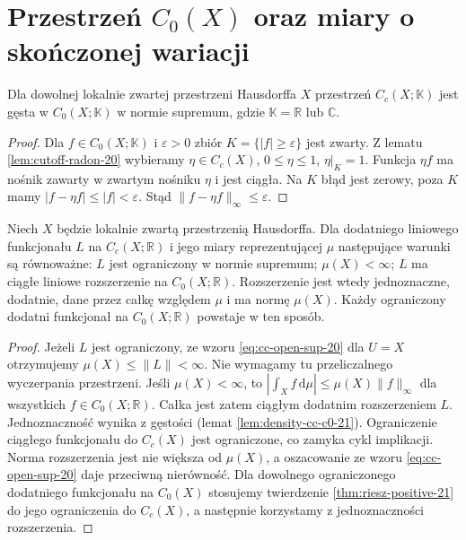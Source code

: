 \section{Przestrzeń \texorpdfstring{$C_0(X)$}{C\string_0(X)} oraz miary o skończonej wariacji}
\begin{lemat}[Gęstość $C_c(X)$ w $C_0(X)$]
\label{lem:density-cc-c0-21}
Dla dowolnej lokalnie zwartej przestrzeni Hausdorffa $X$
przestrzeń $C_c(X;\mathbb K)$ jest gęsta w
$C_0(X;\mathbb K)$ w normie supremum, gdzie
$\mathbb K=\mathbb R$ lub $\mathbb C$.
\end{lemat}
\begin{proof}
Dla $f\in C_0(X;\mathbb K)$ i $\varepsilon>0$
zbiór $K=\{|f|\ge\varepsilon\}$ jest zwarty.
Z lematu \ref{lem:cutoff-radon-20} wybieramy
$\eta\in C_c(X)$, $0\le\eta\le1$, $\eta|_K=1$.
Funkcja $\eta f$ ma nośnik zawarty w zwartym
nośniku $\eta$ i jest ciągła. Na $K$ błąd jest
zerowy, poza $K$ mamy $|f-\eta f|\le |f|<\varepsilon$.
Stąd $\|f-\eta f\|_\infty\le\varepsilon$.
\end{proof}

\begin{twierdzenie}
\label{thm:riesz-c0-positive-21}
Niech $X$ będzie lokalnie zwartą przestrzenią Hausdorffa.
Dla dodatniego liniowego funkcjonału $L$ na $C_c(X;\mathbb R)$
i jego miary reprezentującej $\mu$ następujące warunki
są równoważne: $L$ jest ograniczony w normie supremum;
$\mu(X)<\infty$; $L$ ma ciągłe liniowe rozszerzenie
na $C_0(X;\mathbb R)$. Rozszerzenie jest wtedy
jednoznaczne, dodatnie, dane przez całkę względem $\mu$
i ma normę $\mu(X)$.
Każdy ograniczony dodatni funkcjonał na $C_0(X;\mathbb R)$
powstaje w ten sposób.
\end{twierdzenie}
\begin{proof}
Jeżeli $L$ jest ograniczony, ze wzoru
\eqref{eq:cc-open-sup-20} dla $U=X$ otrzymujemy
$\mu(X)\le\|L\|<\infty$. Nie wymagamy tu
przeliczalnego wyczerpania przestrzeni.
Jeśli $\mu(X)<\infty$, to
$|\int_X f\,\mathrm d\mu|\le\mu(X)\|f\|_\infty$
dla wszystkich $f\in C_0(X;\mathbb R)$.
Całka jest zatem ciągłym dodatnim rozszerzeniem
$L$. Jednoznaczność wynika z gęstości
(lemat \ref{lem:density-cc-c0-21}).
Ograniczenie ciągłego funkcjonału do $C_c(X)$
jest ograniczone, co zamyka cykl implikacji.
Norma rozszerzenia jest nie większa od $\mu(X)$,
a oszacowanie ze wzoru \eqref{eq:cc-open-sup-20}
daje przeciwną nierówność. Dla dowolnego
ograniczonego dodatniego funkcjonału na $C_0(X)$
stosujemy twierdzenie \ref{thm:riesz-positive-21}
do jego ograniczenia do $C_c(X)$, a następnie
korzystamy z jednoznaczności rozszerzenia.
\end{proof}

